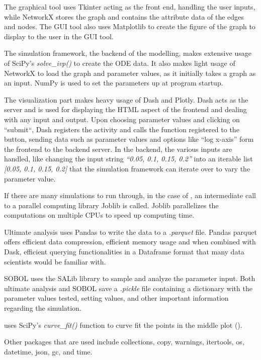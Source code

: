 The graphical tool uses Tkinter acting as the front end, handling the user inputs, while NetworkX \cite{hagbergExploringNetworkStructure2008} stores the graph and contains the attribute data of the edges and nodes. 
The GUI tool also uses Matplotlib \cite{Matplotlib} to create the figure of the graph to display to the user in the GUI tool.

The simulation framework, the backend of the modelling, makes extensive usage of SciPy's \textit{solve\_ivp()} to create the ODE data. 
It also makes light usage of NetworkX to load the graph and parameter values, as it initially takes a graph as an input. 
NumPy is used to set the parameters up at program startup. 

The visualization part makes heavy usage of Dash and Plotly. 
Dash acts as the server and is used for displaying the HTML aspect of the frontend and dealing with any input and output. 
Upon choosing parameter values and clicking on “submit“, Dash registers the activity and calls the function registered to the button, sending data such as parameter values and options like “log x-axis” form the frontend to the backend server. 
In the backend, the various inputs are handled, like changing the input string \textit{“0.05, 0.1, 0.15, 0.2”} into an iterable list \textit{[0.05, 0.1, 0.15, 0.2]} that the simulation framework can iterate over to vary the parameter value. 

If there are many simulations to run through, in the case of , an intermediate call to a parallel computing library Joblib is called. 
Joblib parallelizes the computations on multiple CPUs to speed up computing time. 

Ultimate analysis uses Pandas to write the data to a \textit{.parquet} file. 
Pandas parquet offers efficient data compression, efficient memory usage and when combined with Dask, efficient querying functionalities in a Dataframe format that many data scientists would be familiar with. 

SOBOL uses the SALib library to sample and analyze the parameter input. 
Both ultimate analysis and SOBOL save a \textit{.pickle} file containing a dictionary with the parameter values tested, setting values, and other important information regarding the simulation. 

 uses SciPy's \textit{curve\_fit()} function to curve fit the points in the middle plot (). 

Other packages that are used include collections, copy, warnings, itertools, os, datetime, json, gc, and time. 

